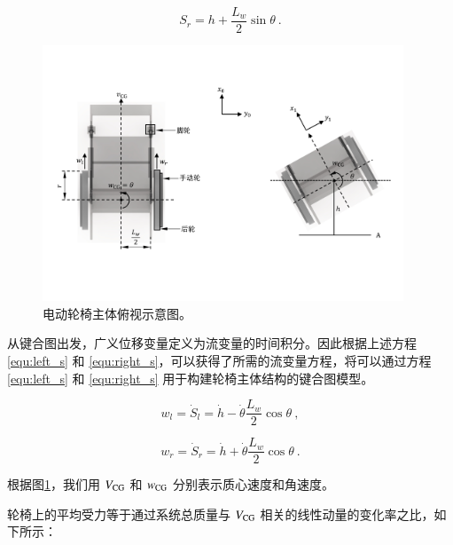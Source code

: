 	\begin{equation}
	\label{equ:right_s}
	S_r = h
	+
	\frac{L_w}{2} \sin \theta
	\ .
	\end{equation}
	
	\begin{figure}[!h]
		\centering
		\includegraphics[width=0.96\textwidth]{fig/top_view.pdf}
		\caption{电动轮椅主体俯视示意图。}\label{fig:top_view}
	\end{figure}
	
	从键合图出发，广义位移变量定义为流变量的时间积分。因此根据上述方程 \ref{equ:left_s} 和 \ref{equ:right_s}，可以获得了所需的流变量方程，将可以通过方程 \ref{equ:left_s} 和 \ref{equ:right_s} 用于构建轮椅主体结构的键合图模型。
	
	\begin{equation}
	\label{equ:left_w}
	w_{l}
	=
	\dot{S}_{l}
	=
	\dot{h}
	-
	\dot{\theta} \frac{L_w}{2} \cos \theta
	\ ,
	\end{equation}
	
	\begin{equation}
	\label{equ:right_w}
	w_{r}
	=
	\dot{S}_{r}
	=
	\dot{h}
	+
	\dot{\theta} \frac{L_w}{2} \cos \theta
	\ .
	\end{equation}
	
	根据图\ref{fig:top_view}，我们用 $ V_{\rm{CG}} $ 和 $ w_{\rm{CG}} $ 分别表示质心速度和角速度。
	
	轮椅上的平均受力等于通过系统总质量与 $ V_{\rm{CG}} $ 相关的线性动量的变化率之比，如下所示：
	
